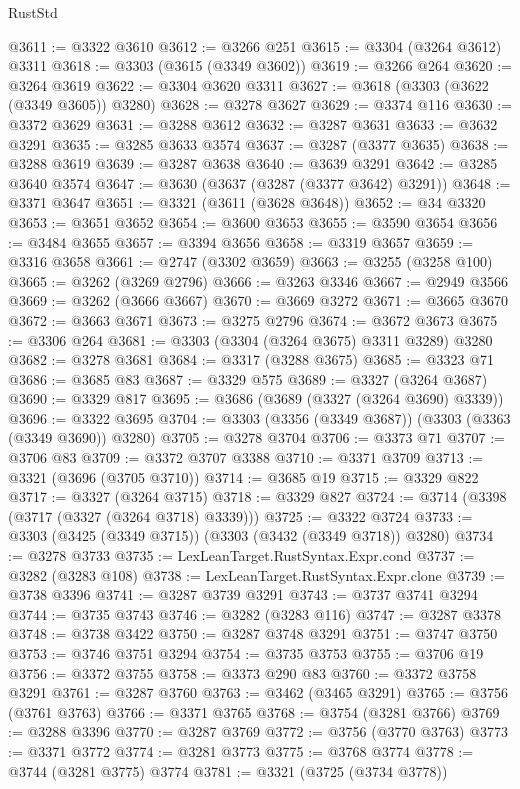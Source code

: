 \begin{lexlean}{RustStd}
\begin{coremodule}
{\begin{coremodule}
{{{{{{{{{{{{{{{{{{{{{{{{{{{{{{{{{@3611 := @3322 @3610
@3612 := @3266 @251
@3615 := @3304 (@3264 @3612) @3311
@3618 := @3303 (@3615 (@3349 @3602))
@3619 := @3266 @264
@3620 := @3264 @3619
@3622 := @3304 @3620 @3311
@3627 := @3618 (@3303 (@3622 (@3349 @3605)) @3280)
@3628 := @3278 @3627
@3629 := @3374 @116
@3630 := @3372 @3629
@3631 := @3288 @3612
@3632 := @3287 @3631
@3633 := @3632 @3291
@3635 := @3285 @3633 @3574
@3637 := @3287 (@3377 @3635)
@3638 := @3288 @3619
@3639 := @3287 @3638
@3640 := @3639 @3291
@3642 := @3285 @3640 @3574
@3647 := @3630 (@3637 (@3287 (@3377 @3642) @3291))
@3648 := @3371 @3647
@3651 := @3321 (@3611 (@3628 @3648))
@3652 := @34 @3320
@3653 := @3651 @3652
@3654 := @3600 @3653
@3655 := @3590 @3654
@3656 := @3484 @3655
@3657 := @3394 @3656
@3658 := @3319 @3657
@3659 := @3316 @3658
@3661 := @2747 (@3302 @3659)
@3663 := @3255 (@3258 @100)
@3665 := @3262 (@3269 @2796)
@3666 := @3263 @3346
@3667 := @2949 @3566
@3669 := @3262 (@3666 @3667)
@3670 := @3669 @3272
@3671 := @3665 @3670
@3672 := @3663 @3671
@3673 := @3275 @2796
@3674 := @3672 @3673
@3675 := @3306 @264
@3681 := @3303 (@3304 (@3264 @3675) @3311 @3289) @3280
@3682 := @3278 @3681
@3684 := @3317 (@3288 @3675)
@3685 := @3323 @71
@3686 := @3685 @83
@3687 := @3329 @575
@3689 := @3327 (@3264 @3687)
@3690 := @3329 @817
@3695 := @3686 (@3689 (@3327 (@3264 @3690) @3339))
@3696 := @3322 @3695
@3704 := @3303 (@3356 (@3349 @3687)) (@3303 (@3363 (@3349 @3690)) @3280)
@3705 := @3278 @3704
@3706 := @3373 @71
@3707 := @3706 @83
@3709 := @3372 @3707 @3388
@3710 := @3371 @3709
@3713 := @3321 (@3696 (@3705 @3710))
@3714 := @3685 @19
@3715 := @3329 @822
@3717 := @3327 (@3264 @3715)
@3718 := @3329 @827
@3724 := @3714 (@3398 (@3717 (@3327 (@3264 @3718) @3339)))
@3725 := @3322 @3724
@3733 := @3303 (@3425 (@3349 @3715)) (@3303 (@3432 (@3349 @3718)) @3280)
@3734 := @3278 @3733
@3735 := LexLeanTarget.RustSyntax.Expr.cond
@3737 := @3282 (@3283 @108)
@3738 := LexLeanTarget.RustSyntax.Expr.clone
@3739 := @3738 @3396
@3741 := @3287 @3739 @3291
@3743 := @3737 @3741 @3294
@3744 := @3735 @3743
@3746 := @3282 (@3283 @116)
@3747 := @3287 @3378
@3748 := @3738 @3422
@3750 := @3287 @3748 @3291
@3751 := @3747 @3750
@3753 := @3746 @3751 @3294
@3754 := @3735 @3753
@3755 := @3706 @19
@3756 := @3372 @3755
@3758 := @3373 @290 @83
@3760 := @3372 @3758 @3291
@3761 := @3287 @3760
@3763 := @3462 (@3465 @3291)
@3765 := @3756 (@3761 @3763)
@3766 := @3371 @3765
@3768 := @3754 (@3281 @3766)
@3769 := @3288 @3396
@3770 := @3287 @3769
@3772 := @3756 (@3770 @3763)
@3773 := @3371 @3772
@3774 := @3281 @3773
@3775 := @3768 @3774
@3778 := @3744 (@3281 @3775) @3774
@3781 := @3321 (@3725 (@3734 @3778))
}}}}}}}}}}}}}}}}}}}}}}}}}}}}}}}}}
\end{coremodule}}
\end{coremodule}
\end{lexlean}
